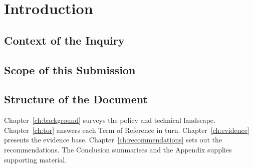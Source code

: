 \chapter{Introduction}
\label{ch:introduction}


\section{Context of the Inquiry}
\label{sec:intro:context}

\lipsum[1-2]

\section{Scope of this Submission}
\label{sec:intro:scope}

\lipsum[3]

\section{Structure of the Document}
\label{sec:intro:structure}

Chapter~\ref{ch:background} surveys the policy and technical landscape. Chapter~\ref{ch:tor} answers each Term of Reference in turn. Chapter~\ref{ch:evidence} presents the evidence base. Chapter~\ref{ch:recommendations} sets out the recommendations. The Conclusion summarises and the Appendix supplies supporting material.
